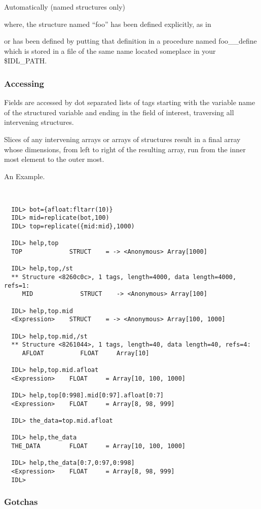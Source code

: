   \item Automatically (named structures only)


  where, the structure named ``foo'' has been defined explicitly, as in 

  
  or has been defined by putting that definition in a procedure named
  foo\_\_define which is stored in a file of the same name located
  someplace in your \$IDL\_PATH.

\ei

\subsubsection{Accessing}

Fields are accessed by dot separated lists of tags starting with the
variable name of the structured variable and ending in the field of
interest, traversing all intervening structures. 

Slices of any intervening arrays or arrays of structures result in a
final array whose dimensions, from left to right of the resulting
array, run from the inner most element to the outer most.


An Example.

\begin{IDLExample}\begin{verbatim}
  

  IDL> bot={afloat:fltarr(10)}
  IDL> mid=replicate(bot,100)
  IDL> top=replicate({mid:mid},1000)

  IDL> help,top
  TOP             STRUCT    = -> <Anonymous> Array[1000]

  IDL> help,top,/st
  ** Structure <8260c0c>, 1 tags, length=4000, data length=4000, refs=1:
     MID             STRUCT    -> <Anonymous> Array[100]

  IDL> help,top.mid
  <Expression>    STRUCT    = -> <Anonymous> Array[100, 1000]

  IDL> help,top.mid,/st
  ** Structure <8261044>, 1 tags, length=40, data length=40, refs=4:
     AFLOAT          FLOAT     Array[10]

  IDL> help,top.mid.afloat
  <Expression>    FLOAT     = Array[10, 100, 1000]

  IDL> help,top[0:998].mid[0:97].afloat[0:7]
  <Expression>    FLOAT     = Array[8, 98, 999]

  IDL> the_data=top.mid.afloat

  IDL> help,the_data
  THE_DATA        FLOAT     = Array[10, 100, 1000]

  IDL> help,the_data[0:7,0:97,0:998]
  <Expression>    FLOAT     = Array[8, 98, 999]
  IDL> 

\end{verbatim}\end{IDLExample}


\subsubsection{Gotchas}
